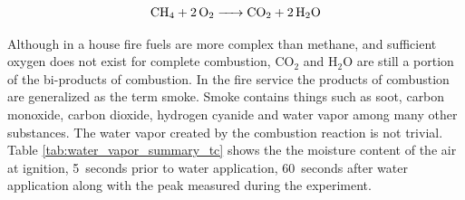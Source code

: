\documentclass[12pt,oneside]{book}
\begin{document}
\begin{equation}
\ce{CH4 + 2O2 -> CO2 + 2H2O}
\label{eq:comb_methane}
\end{equation}

Although in a house fire fuels are more complex than methane, and sufficient oxygen does not exist for complete combustion, CO$_2$ and H$_2$O are still a portion of the bi-products of combustion. In the fire service the products of combustion are generalized as the term smoke. Smoke contains things such as soot, carbon monoxide, carbon dioxide, hydrogen cyanide and water vapor among many other substances. The water vapor created by the combustion reaction is not trivial. Table \ref{tab:water_vapor_summary_tc} shows the the moisture content of the air at ignition, 5~seconds prior to water application, 60~seconds after water application along with the peak measured during the experiment. 
\end{document}
